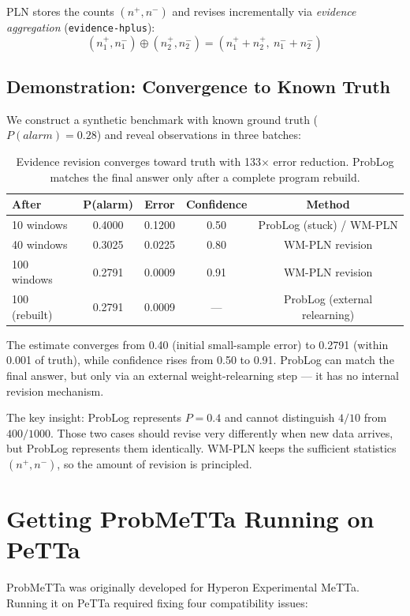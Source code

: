 \documentclass[11pt,a4paper]{article}
\theoremstyle{definition}
\begin{document}
PLN stores the counts $(n^+, n^-)$ and revises incrementally via
\emph{evidence aggregation} (\texttt{evidence-hplus}):
\[
(n^+_1, n^-_1) \oplus (n^+_2, n^-_2) = (n^+_1 + n^+_2,\ n^-_1 + n^-_2)
\]

\subsection{Demonstration: Convergence to Known Truth}

We construct a synthetic benchmark with known ground truth
($P(\mathit{alarm}) = 0.28$) and reveal observations in three batches:

\begin{table}[h]
\centering
\begin{tabular}{lcccc}
\toprule
\textbf{After} & \textbf{P(alarm)} & \textbf{Error} & \textbf{Confidence} & \textbf{Method} \\
\midrule
10 windows  & 0.4000 & 0.1200 & 0.50 & ProbLog (stuck) / WM-PLN \\
40 windows  & 0.3025 & 0.0225 & 0.80 & WM-PLN revision \\
100 windows & 0.2791 & 0.0009 & 0.91 & WM-PLN revision \\
\midrule
100 (rebuilt) & 0.2791 & 0.0009 & --- & ProbLog (external relearning) \\
\bottomrule
\end{tabular}
\caption{Evidence revision converges toward truth with 133$\times$ error reduction.
ProbLog matches the final answer only after a complete program rebuild.}
\end{table}

The estimate converges from 0.40 (initial small-sample error) to 0.2791
(within 0.001 of truth), while confidence rises from 0.50 to 0.91.
ProbLog can match the final answer, but only via an external
weight-relearning step --- it has no internal revision mechanism.

The key insight: ProbLog represents $P = 0.4$ and cannot distinguish
$4/10$ from $400/1000$. Those two cases should revise very differently
when new data arrives, but ProbLog represents them identically.
WM-PLN keeps the sufficient statistics $(n^+, n^-)$, so
the amount of revision is principled.

\section{Getting ProbMeTTa Running on PeTTa}

ProbMeTTa was originally developed for Hyperon Experimental MeTTa. Running
it on PeTTa required fixing four compatibility issues:
\end{document}
